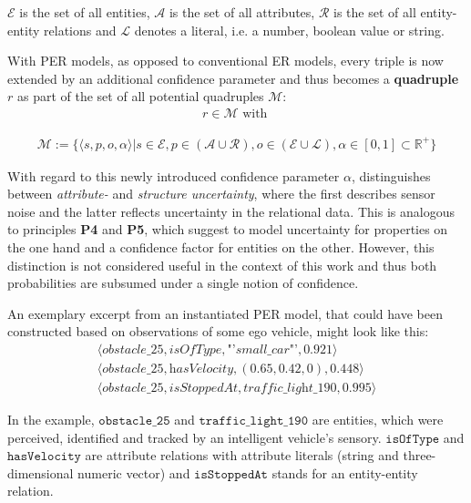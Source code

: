 $\mathcal{E}$ is the set of all entities, $\mathcal{A}$ is the set of all attributes, $\mathcal{R}$ is the set of all entity-entity relations and $\mathcal{L}$ denotes a literal, i.e. a number, boolean value or string.

With PER models, as opposed to conventional ER models, every triple is now extended by an additional confidence parameter and thus becomes a \textbf{quadruple} $r$ as part of the set of all potential quadruples $\mathcal{M}$: 
\begin{gather}
	r \in \mathcal{M} \text{\ with\ }
	\label{eq:quadruples}
\end{gather}

\vspace{-8ex}

\begin{gather*}
	\mathcal{M} := \{ \langle s, p, o, \alpha \rangle | s \in \mathcal{E}, p \in (\mathcal{A} \cup \mathcal{R}), o \in (\mathcal{E} \cup \mathcal{L}), \alpha \in [0, 1] \subset \mathbb{R}^+ \}
\end{gather*}

With regard to this newly introduced confidence parameter $\alpha$, \cite{Petrich2018} distinguishes between \textit{attribute-} and \textit{structure uncertainty}, where the first describes sensor noise and the latter reflects uncertainty in the relational data. This is analogous to principles \textbf{P4} and \textbf{P5}, which suggest to model uncertainty for properties on the one hand and a confidence factor for entities on the other. However, this distinction is not considered useful in the context of this work and thus both probabilities are subsumed under a single notion of confidence.

An exemplary excerpt from an instantiated PER model, that could have been constructed based on observations of some ego vehicle, might look like this:
\begin{gather*}
	\langle \textit{obstacle\_25}, \textit{isOfType}, \textit{"'small\_car"'}, 0.921 \rangle \\
	\langle \textit{obstacle\_25}, \textit{hasVelocity}, (0.65, 0.42, 0), 0.448 \rangle \\
	\langle \textit{obstacle\_25}, \textit{isStoppedAt}, \textit{traffic\_light\_190}, 0.995 \rangle
\end{gather*}

In the example, $\texttt{obstacle\_25}$ and $\texttt{traffic\_light\_190}$ are entities, which were perceived, identified and tracked by an intelligent vehicle's sensory. $\texttt{isOfType}$ and $\texttt{hasVelocity}$ are attribute relations with attribute literals (string and three-dimensional numeric vector) and $\texttt{isStoppedAt}$ stands for an entity-entity relation.

